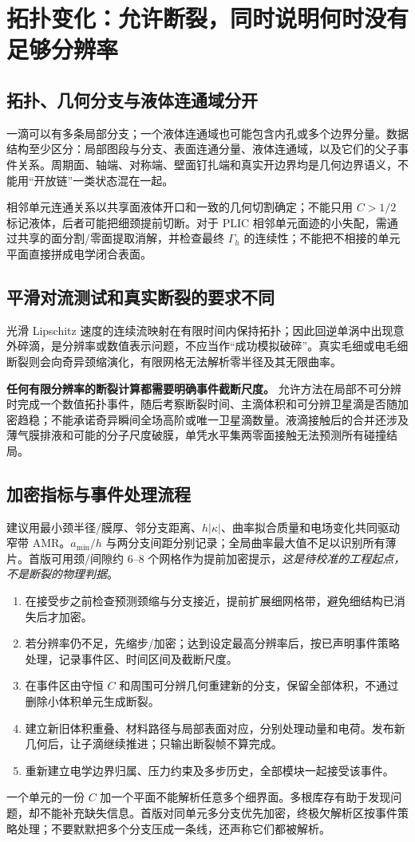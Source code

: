 \documentclass[11pt,a4paper]{article}
\begin{document}
\clearpage
\section{拓扑变化：允许断裂，同时说明何时没有足够分辨率}
\subsection{拓扑、几何分支与液体连通域分开}
一滴可以有多条局部分支；一个液体连通域也可能包含内孔或多个边界分量。数据结构至少区分：局部图段与分支、表面连通分量、液体连通域，以及它们的父子事件关系。周期面、轴端、对称端、壁面钉扎端和真实开边界均是几何边界语义，不能用“开放链”一类状态混在一起。

相邻单元连通关系以共享面液体开口和一致的几何切割确定；不能只用 $C>1/2$ 标记液体，后者可能把细颈提前切断。对于 PLIC 相邻单元面迹的小失配，需通过共享的面分割/零面提取消解，并检查最终 $\Gamma_h$ 的连续性；不能把不相接的单元平面直接拼成电学闭合表面。

\subsection{平滑对流测试和真实断裂的要求不同}
光滑 Lipschitz 速度的连续流映射在有限时间内保持拓扑；因此回逆单涡中出现意外碎滴，是分辨率或数值表示问题，不应当作“成功模拟破碎”。真实毛细或电毛细断裂则会向奇异颈缩演化，有限网格无法解析零半径及其无限曲率。

\textbf{任何有限分辨率的断裂计算都需要明确事件截断尺度。} 允许方法在局部不可分辨时完成一个数值拓扑事件，随后考察断裂时间、主滴体积和可分辨卫星滴是否随加密趋稳；不能承诺奇异瞬间全场高阶或唯一卫星滴数量。液滴接触后的合并还涉及薄气膜排液和可能的分子尺度破膜，单凭水平集两零面接触无法预测所有碰撞结局。

\subsection{加密指标与事件处理流程}
建议用最小颈半径/膜厚、邻分支距离、$h|\kappa|$、曲率拟合质量和电场变化共同驱动窄带 AMR。$a_{\min}/h$ 与两分支间距分别记录；全局曲率最大值不足以识别所有薄片。首版可用颈/间隙约 $6$--$8$ 个网格作为提前加密提示，\emph{这是待校准的工程起点，不是断裂的物理判据}。
\begin{enumerate}
\item 在接受步之前检查预测颈缩与分支接近，提前扩展细网格带，避免细结构已消失后才加密。
\item 若分辨率仍不足，先缩步/加密；达到设定最高分辨率后，按已声明事件策略处理，记录事件区、时间区间及截断尺度。
\item 在事件区由守恒 $C$ 和周围可分辨几何重建新的分支，保留全部体积，不通过删除小体积单元生成断裂。
\item 建立新旧体积重叠、材料路径与局部表面对应，分别处理动量和电荷。发布新几何后，让子滴继续推进；只输出断裂帧不算完成。
\item 重新建立电学边界归属、压力约束及多步历史，全部模块一起接受该事件。
\end{enumerate}
一个单元的一份 $C$ 加一个平面不能解析任意多个细界面。多根库存有助于发现问题，却不能补充缺失信息。首版对同单元多分支优先加密，终极欠解析区按事件策略处理；不要默默把多个分支压成一条线，还声称它们都被解析。
\end{document}
